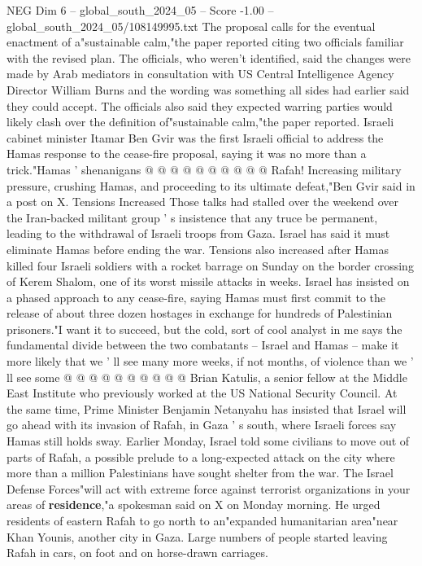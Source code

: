 \begin{textsample}{NEG Dim 6 – global\_south\_2024\_05 – Score -1.00 – global\_south\_2024\_05/108149995.txt}
The proposal calls for the eventual enactment of a"sustainable calm,"the paper reported citing two officials familiar with the revised plan.
The officials, who weren't identified, said the changes were made by Arab mediators in consultation with US Central Intelligence Agency Director William Burns and the wording was something all sides had earlier said they could accept.
The officials also said they expected warring parties would likely clash over the definition of"sustainable calm,"the paper reported.
Israeli cabinet minister Itamar Ben Gvir was the first Israeli official to address the Hamas response to the cease-fire proposal, saying it was no more than a trick."Hamas ' shenanigans @ @ @ @ @ @ @ @ @ @ Rafah!
Increasing military pressure, crushing Hamas, and proceeding to its ultimate defeat,"Ben Gvir said in a post on X.
Tensions Increased Those talks had stalled over the weekend over the Iran-backed militant group ' s insistence that any truce be permanent, leading to the withdrawal of Israeli troops from Gaza.
Israel has said it must eliminate Hamas before ending the war.
Tensions also increased after Hamas killed four Israeli soldiers with a rocket barrage on Sunday on the border crossing of Kerem Shalom, one of its worst missile attacks in weeks.
Israel has insisted on a phased approach to any cease-fire, saying Hamas must first commit to the release of about three dozen hostages in exchange for hundreds of Palestinian prisoners."I want it to succeed, but the cold, sort of cool analyst in me says the fundamental divide between the two combatants -- Israel and Hamas -- make it more likely that we ' ll see many more weeks, if not months, of violence than we ' ll see some @ @ @ @ @ @ @ @ @ @ Brian Katulis, a senior fellow at the Middle East Institute who previously worked at the US National Security Council.
At the same time, Prime Minister Benjamin Netanyahu has insisted that Israel will go ahead with its invasion of Rafah, in Gaza ' s south, where Israeli forces say Hamas still holds sway.
Earlier Monday, Israel told some civilians to move out of parts of Rafah, a possible prelude to a long-expected attack on the city where more than a million Palestinians have sought shelter from the war.
The Israel Defense Forces"will act with extreme force against terrorist organizations in your areas of \textbf{residence},"a spokesman said on X on Monday morning.
He urged residents of eastern Rafah to go north to an"expanded humanitarian area"near Khan Younis, another city in Gaza.
Large numbers of people started leaving Rafah in cars, on foot and on horse-drawn carriages.

\end{textsample}
